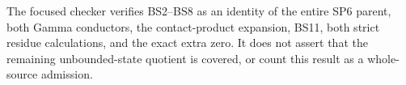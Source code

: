 The focused checker verifies BS2--BS8 as an identity of the entire
SP6 parent, both Gamma conductors, the contact-product expansion,
BS11, both strict residue calculations, and the exact extra zero.
It does not assert that the remaining unbounded-state quotient is
covered, or count this result as a whole-source admission.
